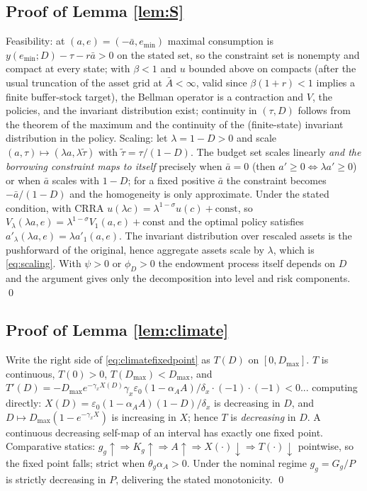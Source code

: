 \documentclass[12pt]{article}
\begin{document}
\subsection{Proof of Lemma \ref{lem:S}}
Feasibility: at $(a,e)=(-\bar a, e_{\min})$ maximal consumption is
$y(e_{\min};D)-\tau-r\bar a>0$ on the stated set, so the constraint set
is nonempty and compact at every state; with $\beta<1$ and $u$ bounded above
on compacts (after the usual truncation of the asset grid at
$\bar A<\infty$, valid since $\beta(1+r)<1$ implies a finite buffer-stock
target), the Bellman operator is a contraction and $V$, the policies, and the
invariant distribution exist; continuity in $(\tau,D)$ follows from the
theorem of the maximum and the continuity of the (finite-state) invariant
distribution in the policy. Scaling: let $\lambda=1-D>0$ and scale
$(a,\tau)\mapsto(\lambda a,\lambda\tilde\tau)$ with
$\tilde\tau=\tau/(1-D)$. The budget set scales linearly \emph{and the
borrowing constraint maps to itself} precisely when $\bar a=0$ (then
$a'\ge0\Leftrightarrow\lambda a'\ge0$) or when $\bar a$ scales with $1-D$;
for a fixed positive $\bar a$ the constraint becomes $-\bar a/(1-D)$ and the
homogeneity is only approximate. Under the stated condition, with CRRA
$u(\lambda c)=\lambda^{1-\sigma}u(c)+\text{const}$, so
$V_\lambda(\lambda a,e)=\lambda^{1-\sigma}V_1(a,e)+\text{const}$ and the
optimal policy satisfies $a'_\lambda(\lambda a,e)=\lambda a'_1(a,e)$. The
invariant distribution over rescaled assets is the pushforward of the
original, hence aggregate assets scale by $\lambda$, which is
\eqref{eq:scaling}. With $\psi>0$ or $\phi_D>0$ the endowment process itself
depends on $D$ and the argument gives only the decomposition into level and
risk components. \qed

\subsection{Proof of Lemma \ref{lem:climate}}
Write the right side of \eqref{eq:climatefixedpoint} as $T(D)$ on
$[0,D_{\max}]$. $T$ is continuous, $T(0)>0$, $T(D_{\max})<D_{\max}$, and
$T'(D) = -D_{\max}e^{-\gamma_x X(D)}\gamma_x \varepsilon_0
(1-\alpha_A A)/\delta_x \cdot(-1) \cdot(-1) <0$... computing directly:
$X(D)=\varepsilon_0(1-\alpha_A A)(1-D)/\delta_x$ is decreasing in $D$, and
$D\mapsto D_{\max}(1-e^{-\gamma_x X})$ is increasing in $X$; hence $T$ is
\emph{decreasing} in $D$. A continuous decreasing self-map of an interval has
exactly one fixed point. Comparative statics: $g_g\uparrow \Rightarrow
K_g\uparrow \Rightarrow A\uparrow \Rightarrow X(\cdot)\downarrow \Rightarrow
T(\cdot)\downarrow$ pointwise, so the fixed point falls; strict when
$\theta_g\alpha_A>0$. Under the nominal regime $g_g=G_g/P$ is strictly
decreasing in $P$, delivering the stated monotonicity. \qed
\end{document}
